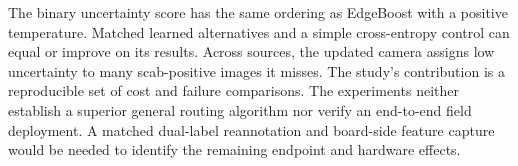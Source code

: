 The binary uncertainty score has the same ordering as EdgeBoost with a positive temperature. Matched learned alternatives and a simple cross-entropy control can equal or improve on its results. Across sources, the updated camera assigns low uncertainty to many scab-positive images it misses. The study's contribution is a reproducible set of cost and failure comparisons. The experiments neither establish a superior general routing algorithm nor verify an end-to-end field deployment. A matched dual-label reannotation and board-side feature capture would be needed to identify the remaining endpoint and hardware effects.
